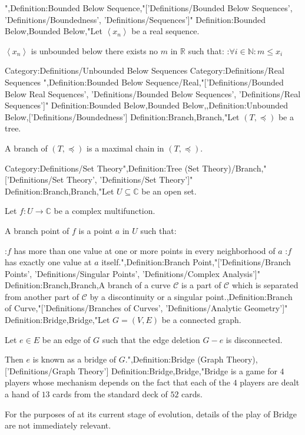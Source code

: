 ",Definition:Bounded Below Sequence,"['Definitions/Bounded Below Sequences', 'Definitions/Boundedness', 'Definitions/Sequences']"
Definition:Bounded Below,Bounded Below,"Let $\left\langle x_n \right\rangle$ be a real sequence.


$\left\langle x_n \right\rangle$ is unbounded below  there exists no $m$ in $\mathbb R$ such that:
:$\forall i \in \mathbb N: m \le x_i$


Category:Definitions/Unbounded Below Sequences
Category:Definitions/Real Sequences
",Definition:Bounded Below Sequence/Real,"['Definitions/Bounded Below Real Sequences', 'Definitions/Bounded Below Sequences', 'Definitions/Real Sequences']"
Definition:Bounded Below,Bounded Below,,Definition:Unbounded Below,['Definitions/Boundedness']
Definition:Branch,Branch,"Let $\left( T, \preceq \right)$ be a tree.

A branch of $\left( T, \preceq \right)$ is a maximal chain in $\left( T, \preceq \right)$.


Category:Definitions/Set Theory",Definition:Tree (Set Theory)/Branch,"['Definitions/Set Theory', 'Definitions/Set Theory']"
Definition:Branch,Branch,"Let $U \subseteq \mathbb C$ be an open set.

Let $f : U \to \mathbb C$ be a complex multifunction.


A branch point of $f$ is a point $a$ in $U$ such that:

:$f$ has more than one value at one or more points in every neighborhood of $a$
:$f$ has exactly one value at $a$ itself.",Definition:Branch Point,"['Definitions/Branch Points', 'Definitions/Singular Points', 'Definitions/Complex Analysis']"
Definition:Branch,Branch,A branch of a curve $\mathcal C$ is a part of $\mathcal C$ which is separated from another part of $\mathcal C$ by a discontinuity or a singular point.,Definition:Branch of Curve,"['Definitions/Branches of Curves', 'Definitions/Analytic Geometry']"
Definition:Bridge,Bridge,"Let $G = \left( V, E \right)$ be a connected graph.

Let $e \in E$ be an edge of $G$ such that the edge deletion $G - e$ is disconnected.


Then $e$ is known as a bridge of $G$.",Definition:Bridge (Graph Theory),['Definitions/Graph Theory']
Definition:Bridge,Bridge,"Bridge is a game for $4$ players whose mechanism depends on the fact that each of the $4$ players are dealt a hand of $13$ cards from the standard deck of $52$ cards.


For the purposes of  at its current stage of evolution, details of the play of Bridge are not immediately relevant.

